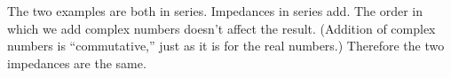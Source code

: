 The two examples are both in series. Impedances in series
add. The order in which we add complex numbers doesn't affect
the result. (Addition of complex numbers is ``commutative,''
just as it is for the real numbers.) Therefore the two
impedances are the same.

